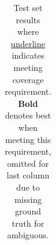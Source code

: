 \begin{table}[tp]
{\begin{tabular}{lccr|cccc}
\bottomrule
\end{tabular}}
    \caption{Test set results where \underline{underline} indicates meeting coverage requirement. \textbf{Bold} denotes best when meeting this requirement, omitted for last column due to missing ground truth for ambiguous.}
    \label{tab:results}
\end{table}
